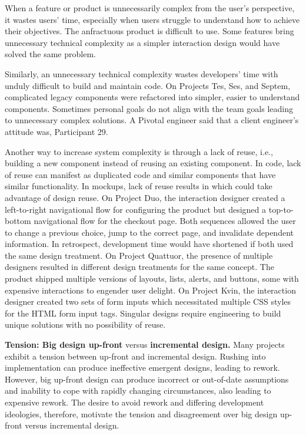 When a feature or product is unnecessarily complex from the user's perspective, it wastes users' time, especially when users struggle to understand how to achieve their objectives. The anfractuous product is difficult to use. Some features bring unnecessary technical complexity as a simpler interaction design would have solved the same problem. %

Similarly, an unnecessary technical complexity wastes developers' time with unduly difficult to build and maintain code. On Projects Tes, Ses, and Septem, complicated legacy components were refactored into simpler, easier to understand components. Sometimes personal goals do not align with the team goals leading to unnecessary complex solutions. A Pivotal engineer said that a client engineer's attitude was,  \textemdash Participant 29.

Another way to increase system complexity is through a lack of reuse, i.e., building a new component instead of reusing an existing component. In code, lack of reuse can manifest as duplicated code and similar components that have similar functionality. In mockups, lack of reuse results in  which could take advantage of design reuse. On Project Duo, the interaction designer created a left-to-right navigational flow for configuring the product but designed a top-to-bottom navigational flow for the checkout page. Both sequences allowed the user to change a previous choice, jump to the correct page, and invalidate dependent information. In retrospect, development time would have shortened if both used the same design treatment. On Project Quattuor, the presence of multiple designers resulted in different design treatments for the same concept. The product shipped multiple versions of layouts, lists, alerts, and buttons, some with expensive interactions to engender user delight. On Project Kvin, the interaction designer created two sets of form inputs which necessitated multiple CSS styles for the HTML form input tags. Singular designs require engineering to build unique solutions with no possibility of reuse.   

\textbf{Tension: Big design up-front} versus \textbf{incremental design.}
Many projects exhibit a tension between up-front and incremental design. Rushing into implementation can produce ineffective emergent designs, leading to rework. However, big up-front design can produce incorrect or out-of-date assumptions and inability to cope with rapidly changing circumstances, also leading to expensive rework. The desire to avoid rework and differing development ideologies, therefore, motivate the tension and disagreement over big design up-front versus incremental design. 

